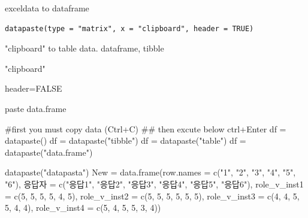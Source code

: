 \documentclass[a4paper]{book}
\begin{document}
%
\begin{Description}
exceldata to dataframe
\end{Description}
%
\begin{Usage}
\begin{verbatim}
datapaste(type = "matrix", x = "clipboard", header = TRUE)
\end{verbatim}
\end{Usage}
%
\begin{Arguments}
\begin{ldescription}
\item[\code{type}] "clipboard" to table data. dataframe, tibble

\item[\code{x}] "clipboard"

\item[\code{header}] header=FALSE
\end{ldescription}
\end{Arguments}
%
\begin{Value}
paste data.frame
\end{Value}
%
\begin{Examples}
\begin{ExampleCode}
#first you must copy data (Ctrl+C)
## then excute below ctrl+Enter
df = datapaste()
df = datapaste("tibble")
df = datapaste("table")
df = datapaste("data.frame")


datapaste("datapasta")
New = data.frame(row.names = c("1", "2", "3", "4", "5", "6"),
                   응답자 = c("응답1", "응답2", "응답3", "응답4", "응답5", "응답6"),
                   role_v_inst1 = c(5, 5, 5, 5, 4, 5),
                   role_v_inst2 = c(5, 5, 5, 5, 5, 5),
                   role_v_inst3 = c(4, 4, 5, 5, 4, 4),
                   role_v_inst4 = c(5, 4, 5, 5, 3, 4))


\end{ExampleCode}
\end{Examples}
\end{document}
